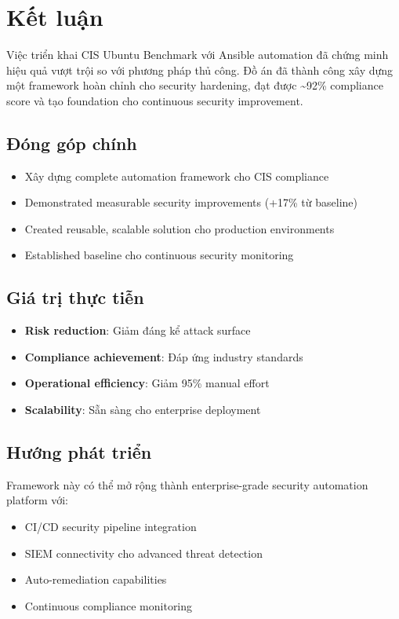\chapter*{Kết luận}

Việc triển khai CIS Ubuntu Benchmark với Ansible automation đã chứng minh hiệu quả vượt trội so với phương pháp thủ công. Đồ án đã thành công xây dựng một framework hoàn chỉnh cho security hardening, đạt được \textasciitilde 92\% compliance score và tạo foundation cho continuous security improvement.

\section*{Đóng góp chính}
\begin{itemize}
    \item Xây dựng complete automation framework cho CIS compliance
    \item Demonstrated measurable security improvements (+17\% từ baseline)
    \item Created reusable, scalable solution cho production environments
    \item Established baseline cho continuous security monitoring
\end{itemize}

\section*{Giá trị thực tiễn}
\begin{itemize}
    \item \textbf{Risk reduction}: Giảm đáng kể attack surface
    \item \textbf{Compliance achievement}: Đáp ứng industry standards
    \item \textbf{Operational efficiency}: Giảm 95\% manual effort
    \item \textbf{Scalability}: Sẵn sàng cho enterprise deployment
\end{itemize}

\section*{Hướng phát triển}
Framework này có thể mở rộng thành enterprise-grade security automation platform với:
\begin{itemize}
    \item CI/CD security pipeline integration
    \item SIEM connectivity cho advanced threat detection
    \item Auto-remediation capabilities
    \item Continuous compliance monitoring
\end{itemize}

